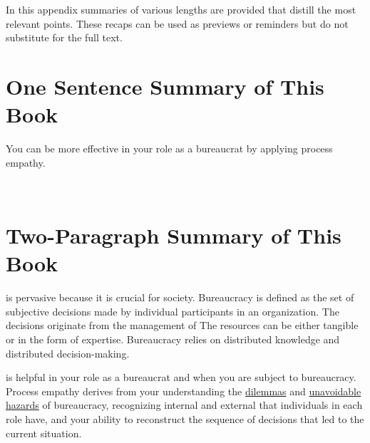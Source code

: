 In this appendix summaries of various lengths are provided that distill the most relevant points. These recaps can be used as previews or reminders but do not substitute for the full text.

\section*{One Sentence Summary of This Book}

You can be more effective in your role as a \gls{bureaucrat} by applying \gls{process empathy}.

\ \\

\section*{Two-Paragraph Summary of This Book}


\iftoggle{glossarysubstitutionworks}{\Gls{bureaucracy}}{Bureaucracy} is pervasive because it is crucial for society. Bureaucracy is defined as the set of subjective decisions made by individual participants in an organization. The decisions originate from the 
management of \iftoggle{glossarysubstitutionworks}{\glspl{shared resource}.}{shared resources.} 
The resources can be either tangible or in the form of expertise. Bureaucracy relies on
distributed knowledge and distributed decision-making.

\iftoggle{glossarysubstitutionworks}{\Gls{process empathy}}{Process empathy} 
is helpful in your role as a bureaucrat and when you are subject to bureaucracy. 
Process empathy derives from your understanding the \hyperref[sec:dilemma-trilemma]{dilemmas} and \hyperref[sec:unavoidable-hazards]{unavoidable hazards} of bureaucracy, recognizing internal
\iftoggle{glossarysubstitutionworks}{\glspl{motive}}{motives} and external 
\iftoggle{glossarysubstitutionworks}{\glspl{incentive}}{incentives}
 that individuals in each role have, and your ability to reconstruct the sequence of decisions that led to the current situation. 





